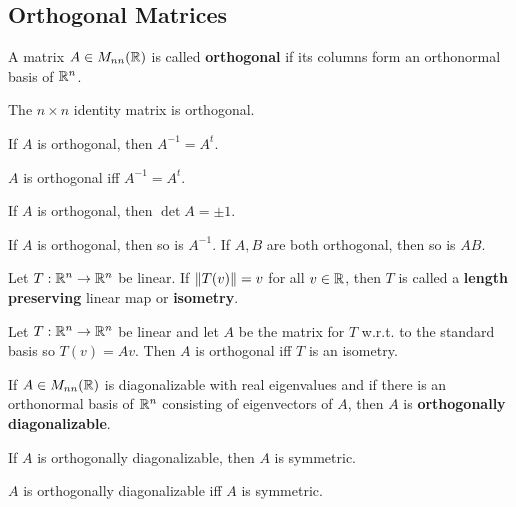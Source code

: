 \documentclass{article}
\begin{document}
    \subsection{Orthogonal Matrices}
    \begin{definition}
      A matrix $A \in M_{nn}(\mathbb{R})$ is called \textbf{orthogonal} if its columns form an orthonormal basis of $\mathbb{R}^n$.
    \end{definition}
    \begin{example}
      The $n\times n$ identity matrix is orthogonal.
    \end{example}
    \begin{theorem}
      If $A$ is orthogonal, then $A^{-1} = A^t$.
    \end{theorem}
    \begin{theorem}
      $A$ is orthogonal iff $A^{-1} = A^t$.
    \end{theorem}
    \begin{theorem}
      If $A$ is orthogonal, then $\det A = \pm 1$.
    \end{theorem}
    \begin{theorem}
      If $A$ is orthogonal, then so is $A^{-1}$. If $A, B$ are both orthogonal, then so is $AB$.
    \end{theorem}
    \begin{definition}
      Let $T: \mathbb{R}^n \to \mathbb{R}^n$ be linear. If $\norm{T(v)} = v$ for all $v \in \mathbb{R}$, then $T$ is called a \textbf{length preserving} linear map or \textbf{isometry}.
    \end{definition}
    \begin{theorem}
      Let $T: \mathbb{R}^n \to \mathbb{R}^n$ be linear and let $A$ be the matrix for $T$ w.r.t. to the standard basis so $T(v) = Av$. Then $A$ is orthogonal iff $T$ is an isometry.
    \end{theorem}
    \begin{definition}
      If $A \in M_{nn}(\mathbb{R})$ is diagonalizable with real eigenvalues and if there is an orthonormal basis of $\mathbb{R}^n$ consisting of eigenvectors of $A$, then $A$ is \textbf{orthogonally diagonalizable}.
    \end{definition}
    \begin{theorem}
      If $A$ is orthogonally diagonalizable, then $A$ is symmetric.
    \end{theorem}
    \begin{cthm}
      $A$ is orthogonally diagonalizable iff $A$ is symmetric.
    \end{cthm}
\end{document}
